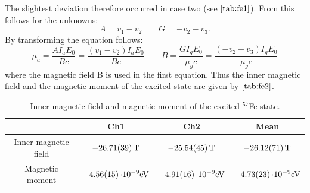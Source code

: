 The slightest deviation therefore occurred in case two (see $\autoref{tab:fe1}$). From this follows for the unknowns:
\begin{equation*}
    A = v_1-v_2 \qquad G = -v_2-v_3.
\end{equation*}
By transforming the equation follows:
\begin{equation}
    \mu_a =\frac{AI_aE_0}{Bc} = \frac{(v_1-v_2)I_aE_0}{Bc} \qquad B= \frac{GI_gE_0}{\mu_gc}=\frac{(-v_2-v_3)I_gE_0}{\mu_gc}
\end{equation}
where the magnetic field B is used in the first equation. Thus the inner magnetic field and the magnetic moment of the excited state are given by $\autoref{tab:fe2}$.
\\

\begin{table}
    \centering
    \caption{Inner magnetic field and magnetic moment of the excited $^{57}$Fe state.}
    
    \begin{tabular}{c c c c} 
     \toprule
     &Ch1&Ch2&Mean \\
     \hline
     Inner magnetic field &  $-\SI{26.71\pm 0.39}{T}$ &$-\SI{25.54\pm 0.45}{T}$   &$-\SI{26.12\pm 0.71}{T}$ \\
     Magnetic moment& $-\SI{4.56\pm 0.15}{\cdot 10^{-9}eV}$  &$-\SI{4.91\pm 0.16}{\cdot 10^{-9}eV}$   &$-\SI{4.73\pm 0.23}{\cdot 10^{-9}eV}$\\
     \bottomrule
    \end{tabular}
    
    \label{tab:fe2}
\end{table}





















